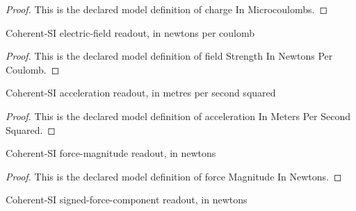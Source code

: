 \begin{proof}
  This is the declared model definition of charge In Microcoulombs.
\end{proof}
\begin{definition}
  \label{def:physics:phyx-mini-0904:phyxminiproblems-problemphyxmini0904-fieldstrengthinnewtonspercoulomb}
  Coherent-SI electric-field readout, in newtons per coulomb
\end{definition}
\begin{proof}
  This is the declared model definition of field Strength In Newtons Per Coulomb.
\end{proof}
\begin{definition}
  \label{def:physics:phyx-mini-0904:phyxminiproblems-problemphyxmini0904-accelerationinmeterspersecondsquared}
  Coherent-SI acceleration readout, in metres per second squared
\end{definition}
\begin{proof}
  This is the declared model definition of acceleration In Meters Per Second Squared.
\end{proof}
\begin{definition}
  \label{def:physics:phyx-mini-0904:phyxminiproblems-problemphyxmini0904-forcemagnitudeinnewtons}
  Coherent-SI force-magnitude readout, in newtons
\end{definition}
\begin{proof}
  This is the declared model definition of force Magnitude In Newtons.
\end{proof}
\begin{definition}
  \label{def:physics:phyx-mini-0904:phyxminiproblems-problemphyxmini0904-signedforceinnewtons}
  Coherent-SI signed-force-component readout, in newtons
\end{definition}
